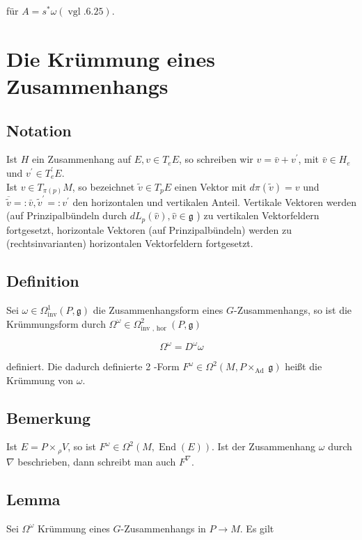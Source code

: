 \documentclass[10pt, letterpaper]{article}
\begin{document}
für $A=s^{*} \omega(\operatorname{vgl} .6 .25)$.

\section*{Die Krümmung eines Zusammenhangs}
\subsection*{Notation}
Ist $H$ ein Zusammenhang auf $E, v \in T_{e} E$, so schreiben wir $v=\bar{v}+v^{\prime}$, mit $\bar{v} \in H_{e}$ und $v^{\prime} \in T_{e}^{\prime} E$.\\
Ist $v \in T_{\pi(p)} M$, so bezeichnet $\tilde{v} \in T_{p} E$ einen Vektor mit $d \pi(\tilde{v})=v$ und $\overline{\tilde{v}}=: \bar{v}, \tilde{v}^{\prime}=: v^{\prime}$ den horizontalen und vertikalen Anteil. Vertikale Vektoren werden (auf Prinzipalbündeln durch $d L_{p}(\hat{v}), \hat{v} \in \mathfrak{g}$ ) zu vertikalen Vektorfeldern fortgesetzt, horizontale Vektoren (auf Prinzipalbündeln) werden zu (rechtsinvarianten) horizontalen Vektorfeldern fortgesetzt.

\subsection*{Definition}
Sei $\omega \in \Omega_{\mathrm{inv}}^{1}(P, \mathfrak{g})$ die Zusammenhangsform eines $G$-Zusammenhangs, so ist die Krümmungsform durch $\Omega^{\omega} \in \Omega_{\text {inv }, \text { hor }}^{2}(P, \mathfrak{g})$

$$
\Omega^{\omega}=D^{\omega} \omega
$$

definiert. Die dadurch definierte 2 -Form $F^{\omega} \in \Omega^{2}\left(M, P \times_{\text {Ad }} \mathfrak{g}\right)$ heißt die Krümmung von $\omega$.

\subsection*{Bemerkung}
Ist $E=P \times{ }_{\rho} V$, so ist $F^{\omega} \in \Omega^{2}(M, \operatorname{End}(E))$. Ist der Zusammenhang $\omega$ durch $\nabla$ beschrieben, dann schreibt man auch $F^{\nabla}$.

\subsection*{Lemma}
Sei $\Omega^{\omega}$ Krümmung eines $G$-Zusammenhangs in $P \rightarrow M$. Es gilt
\end{document}
